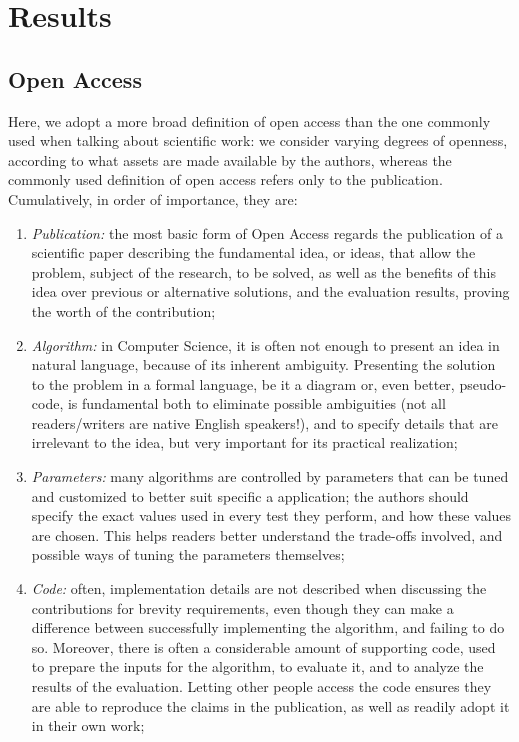 \documentclass[12pt]{article}
\begin{document}
\section{Results}
\label{sec:org20e6825}

\subsection{Open Access}
\label{sec:org6069fee}
Here, we adopt a more broad definition of open access than the one commonly used when talking about scientific work: we consider varying degrees of openness, according to what assets are made available by the authors, whereas the commonly used definition of open access refers only to the publication. Cumulatively, in order of importance, they are:

\begin{enumerate}
\item \emph{Publication:} the most basic form of Open Access regards the publication of a scientific paper describing the fundamental idea, or ideas, that allow the problem, subject of the research, to be solved, as well as the benefits of this idea over previous or alternative solutions, and the evaluation results, proving the worth of the contribution;
\item \emph{Algorithm:} in Computer Science, it is often not enough to present an idea in natural language, because of its inherent ambiguity. Presenting the solution to the problem in a formal language, be it a diagram or, even better, pseudo-code, is fundamental both to eliminate possible ambiguities (not all readers/writers are native English speakers!), and to specify details that are irrelevant to the idea, but very important for its practical realization;
\item \emph{Parameters:} many algorithms are controlled by parameters that can be tuned and customized to better suit specific a application; the authors should specify the exact values used in every test they perform, and how these values are chosen. This helps readers better understand the trade-offs involved, and possible ways of tuning the parameters themselves;
\item \emph{Code:} often, implementation details are not described when discussing the contributions for brevity requirements, even though they can make a difference between successfully implementing the algorithm, and failing to do so. Moreover, there is often a considerable amount of supporting code, used to prepare the inputs for the algorithm, to evaluate it, and to analyze the results of the evaluation. Letting other people access the code ensures they are able to reproduce the claims in the publication, as well as readily adopt it in their own work;

\end{enumerate}
\end{document}
